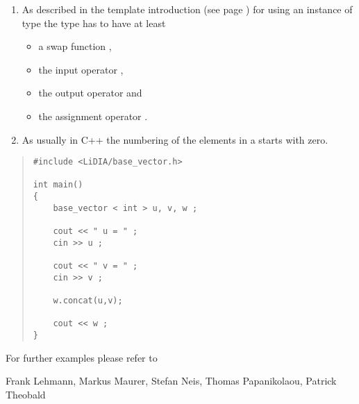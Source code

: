 
\NOTES

\begin{enumerate}
\item As described in the template introduction (see page \pageref{template_introduction}) for
  using an instance of type  the type  has to have at least
  \begin{itemize}
  \item a swap function ,
  \item the input operator \code{>>},
  \item the output operator \code{<<} and
  \item the assignment operator \code{=}.
  \end{itemize}
\item As usually in C++ the numbering of the elements in a  starts with zero.
\end{enumerate}



\EXAMPLES

\begin{quote}
\begin{verbatim}
#include <LiDIA/base_vector.h>

int main()
{
    base_vector < int > u, v, w ;

    cout << " u = " ;
    cin >> u ;

    cout << " v = " ;
    cin >> v ;

    w.concat(u,v);

    cout << w ;
}
\end{verbatim}
\end{quote}

For further examples please refer to 



\AUTHOR

Frank Lehmann, Markus Maurer, Stefan Neis, Thomas Papanikolaou, Patrick
Theobald
